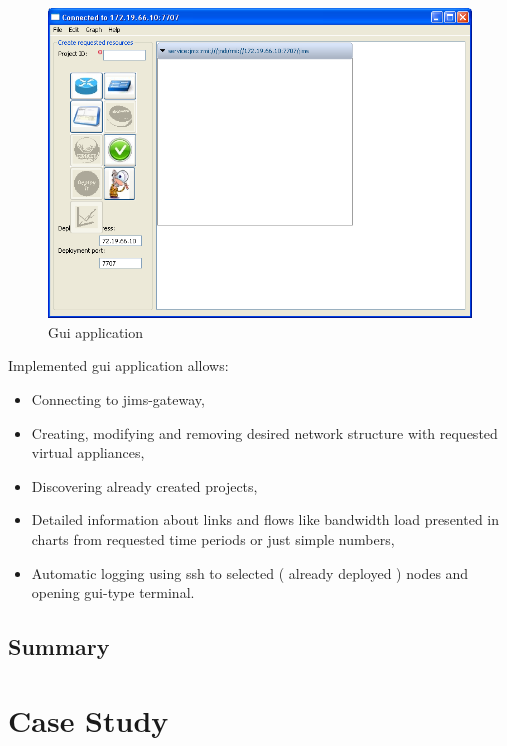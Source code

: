 \documentclass[11pt]{book}
\begin{document}
		\begin{figure}[H]
                  \begin{center}
                    \includegraphics[width=1.0\textwidth]{img/impl/gui.png}
                  \end{center}
                  \caption{Gui application}
                \end{figure}
		
		Implemented gui application allows:
		\begin{itemize}
			\item{Connecting to jims-gateway,}
			\item{Creating, modifying and removing desired network structure with requested virtual appliances,}
			\item{Discovering already created projects,}
			\item{Detailed information about links and flows like bandwidth load presented in charts from requested time periods or just simple numbers,}
			\item{Automatic logging using ssh to selected ( already deployed ) nodes and opening gui-type terminal.}
		\end{itemize}


    \section*{Summary}


  \chapter{Case Study}
\end{document}
